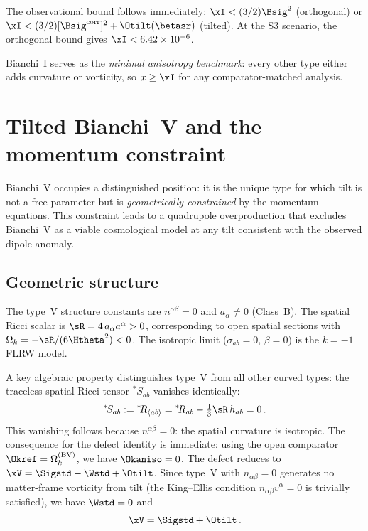 The observational bound follows immediately:
$\xI < (3/2)\Bsig^2$ (orthogonal) or
$\xI < (3/2)[\Bsig^{\mathrm{corr}}]^2 + \Otilt(\betasr)$
(tilted).  At the S3 scenario, the orthogonal bound gives
$\xI < 6.42 \times 10^{-6}$.

Bianchi~I serves as the \emph{minimal anisotropy benchmark}:
every other type either adds curvature or vorticity, so
$x \geq \xI$ for any comparator-matched analysis.


\section{Tilted Bianchi~V and the momentum constraint}
\label{sec:BV-tilt}

Bianchi~V occupies a distinguished position: it is the unique
type for which tilt is not a free parameter but is
\emph{geometrically constrained} by the momentum equations.
This constraint leads to a quadrupole overproduction that
excludes Bianchi~V as a viable cosmological model at any tilt
consistent with the observed dipole anomaly.


\subsection{Geometric structure}\label{sec:BV-geom}

The type~V structure constants are $n^{\alpha\beta} = 0$ and
$a_\alpha \neq 0$ (Class~B).  The spatial Ricci scalar is
$\sR = 4\,a_\alpha a^\alpha > 0$, corresponding to open
spatial sections with $\Omega_k = -\sR/(6\Htheta^2) < 0$.
The isotropic limit ($\sigma_{ab} = 0$, $\beta = 0$) is the
$k = -1$ FLRW model.

A key algebraic property distinguishes type~V from all other
curved types: the traceless spatial Ricci tensor ${}^*\!S_{ab}$
vanishes identically:
\begin{equation}\label{eq:BV-Sab}
{}^*\!S_{ab} := {}^*\!R_{\langle ab\rangle}
= {}^*\!R_{ab} - \tfrac{1}{3}\sR\,h_{ab} = 0\,.
\end{equation}
This vanishing follows because $n^{\alpha\beta} = 0$: the spatial
curvature is isotropic.  The consequence for the defect identity
is immediate: using the open comparator
$\Okref = \Omega_k^{(\mathrm{BV})}$, we have $\Okaniso = 0$.
The defect reduces to
$\xV = \Sigstd - \Wstd + \Otilt$.
Since type~V with $n_{\alpha\beta} = 0$ generates no
matter-frame vorticity from tilt (the King--Ellis condition
$n_{\alpha\beta}v^\alpha = 0$ is trivially satisfied), we have
$\Wstd = 0$ and
\begin{equation}\label{eq:xV-simple}
\xV = \Sigstd + \Otilt\,.
\end{equation}


